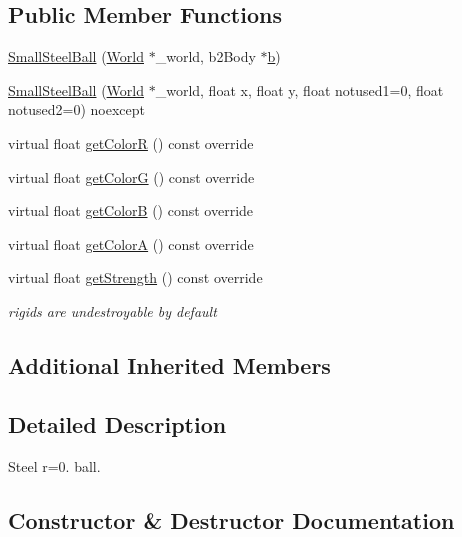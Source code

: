 \subsection*{Public Member Functions}
\begin{DoxyCompactItemize}
\item 
\hyperlink{classSmallSteelBall_a1ea5ad306a9f2f58c1258b04a2f54c3a}{Small\+Steel\+Ball} (\hyperlink{classWorld}{World} $\ast$\+\_\+world, b2\+Body $\ast$\hyperlink{image_8h_ab2d05693952610f937e5acb3c4a8fa1b}{b})
\item 
\hyperlink{classSmallSteelBall_a157358874deba10b80ba47dacdb53d8a}{Small\+Steel\+Ball} (\hyperlink{classWorld}{World} $\ast$\+\_\+world, float x, float y, float notused1=0, float notused2=0) noexcept
\item 
virtual float \hyperlink{classSmallSteelBall_aa15f3c1c1a2596edecb048b8a32f5d55}{get\+Color\+R} () const override
\item 
virtual float \hyperlink{classSmallSteelBall_a8d15df33cfeb00bd61060c7197250989}{get\+Color\+G} () const override
\item 
virtual float \hyperlink{classSmallSteelBall_a7ebf920ae4d29ca94edc7ad390031c37}{get\+Color\+B} () const override
\item 
virtual float \hyperlink{classSmallSteelBall_a2d11278708166ac6b05165baf86c1046}{get\+Color\+A} () const override
\item 
virtual float \hyperlink{classSmallSteelBall_a4831922627448be52f8b8a624ae8302f}{get\+Strength} () const override
\begin{DoxyCompactList}\small\item\em rigids are undestroyable by default \end{DoxyCompactList}\end{DoxyCompactItemize}
\subsection*{Additional Inherited Members}


\subsection{Detailed Description}
Steel r=0. ball. 

\subsection{Constructor \& Destructor Documentation}
\hypertarget{classSmallSteelBall_a1ea5ad306a9f2f58c1258b04a2f54c3a}{}
